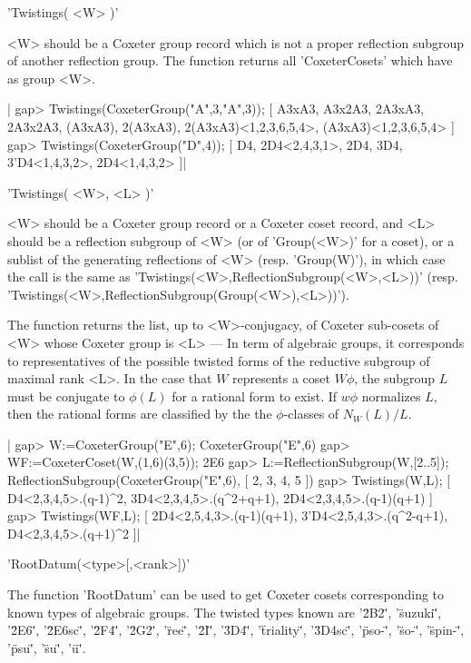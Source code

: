 'Twistings( <W> )'

<W>  should be  a Coxeter  group record  which is  not a  proper reflection
subgroup   of   another   reflection   group.   The  function  returns  all
'CoxeterCosets' which have as group <W>.

|    gap> Twistings(CoxeterGroup("A",3,"A",3));
    [ A3xA3, A3x2A3, 2A3xA3, 2A3x2A3, (A3xA3), 2(A3xA3),
      2(A3xA3)<1,2,3,6,5,4>, (A3xA3)<1,2,3,6,5,4> ]
    gap> Twistings(CoxeterGroup("D",4));
    [ D4, 2D4<2,4,3,1>, 2D4, 3D4, 3'D4<1,4,3,2>, 2D4<1,4,3,2> ]|

'Twistings( <W>, <L> )'

<W>  should be a  Coxeter group record  or a Coxeter  coset record, and <L>
should be a reflection subgroup of <W> (or of 'Group(<W>)' for a coset), or
a sublist of the generating reflections of <W> (resp. 'Group(W)'), in which
case  the call is  the same as 'Twistings(<W>,ReflectionSubgroup(<W>,<L>))'
(resp.  'Twistings(<W>,ReflectionSubgroup(Group(<W>),<L>))').

The  function returns the list, up  to <W>-conjugacy, of Coxeter sub-cosets
of  <W> whose  Coxeter group  is <L>  --- In  term of  algebraic groups, it
corresponds  to  representatives  of  the  possible  twisted  forms  of the
reductive  subgroup of maximal rank <L>. In  the case that $W$ represents a
coset  $W\phi$,  the  subgroup  $L$  must  be  conjugate to $\phi(L)$ for a
rational  form to exist. If $w\phi$ normalizes $L$, then the rational forms
are classified by the the $\phi$-classes of $N_W(L)/L$.

|    gap> W:=CoxeterGroup("E",6);
    CoxeterGroup("E",6)
    gap> WF:=CoxeterCoset(W,(1,6)(3,5));
    2E6
    gap> L:=ReflectionSubgroup(W,[2..5]);
    ReflectionSubgroup(CoxeterGroup("E",6), [ 2, 3, 4, 5 ])
    gap> Twistings(W,L);
    [ D4<2,3,4,5>.(q-1)^2, 3D4<2,3,4,5>.(q^2+q+1),
      2D4<2,3,4,5>.(q-1)(q+1) ]
    gap> Twistings(WF,L);
    [ 2D4<2,5,4,3>.(q-1)(q+1), 3'D4<2,5,4,3>.(q^2-q+1),
      D4<2,3,4,5>.(q+1)^2 ]|


'RootDatum(<type>[,<rank>])'

The function 'RootDatum' can be used to get Coxeter cosets corresponding to
known  types of  algebraic groups.  The twisted  types known are '\"2B2\"',
'\"suzuki\"',  '\"2E6\"',  '\"2E6sc\"',  '\"2F4\"',  '\"2G2\"',  '\"ree\"',
'\"2I\"',  '\"3D4\"',  '\"triality\"',  '\"3D4sc\"', '\"pso-\"', '\"so-\"',
'\"spin-\"', '\"psu\"', '\"su\"', '\"u\"'.

